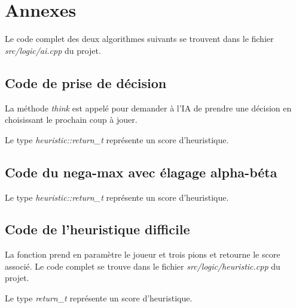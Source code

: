 \chapter{Annexes}

Le code complet des deux algorithmes suivants se trouvent dans le fichier \emph{src/logic/ai.cpp} du projet.

\section{Code de prise de décision}\label{src:think}



La méthode \emph{think} est appelé pour demander à l'IA de prendre une décision en choisissant le prochain coup à
jouer.

Le type \emph{heuristic::return\_t} représente un score d'heuristique.

\section{Code du nega-max avec élagage alpha-béta}\label{src:negamax}



Le type \emph{heuristic::return\_t} représente un score d'heuristique.

\section{Code de l'heuristique difficile}\label{src:heuristic_hard}



La fonction prend en paramètre le joueur et trois pions et retourne le score associé.
Le code complet se trouve dans le fichier \emph{src/logic/heuristic.cpp} du projet.

Le type \emph{return\_t} représente un score d'heuristique.

